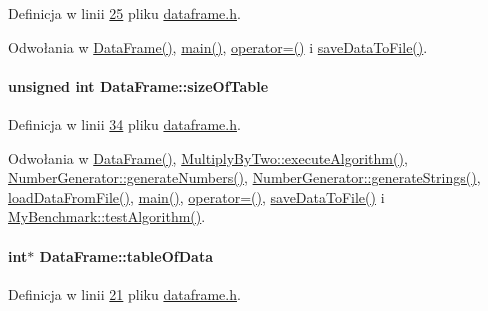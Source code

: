 Definicja w linii \hyperlink{dataframe_8h_source_l00025}{25} pliku \hyperlink{dataframe_8h_source}{dataframe.\-h}.



Odwołania w \hyperlink{dataframe_8cpp_source_l00012}{Data\-Frame()}, \hyperlink{main_8cpp_source_l00018}{main()}, \hyperlink{dataframe_8cpp_source_l00044}{operator=()} i \hyperlink{dataframe_8cpp_source_l00032}{save\-Data\-To\-File()}.

\hypertarget{class_data_frame_aa5d1905c6910cad07ab5189bd34b13ab}{
\paragraph[{size\-Of\-Table}]{\setlength{\rightskip}{0pt plus 5cm}unsigned int Data\-Frame\-::size\-Of\-Table}}\label{class_data_frame_aa5d1905c6910cad07ab5189bd34b13ab}


Definicja w linii \hyperlink{dataframe_8h_source_l00034}{34} pliku \hyperlink{dataframe_8h_source}{dataframe.\-h}.



Odwołania w \hyperlink{dataframe_8cpp_source_l00012}{Data\-Frame()}, \hyperlink{multiplybytwo_8cpp_source_l00011}{Multiply\-By\-Two\-::execute\-Algorithm()}, \hyperlink{numbergenerator_8h_source_l00035}{Number\-Generator\-::generate\-Numbers()}, \hyperlink{numbergenerator_8cpp_source_l00010}{Number\-Generator\-::generate\-Strings()}, \hyperlink{dataframe_8cpp_source_l00020}{load\-Data\-From\-File()}, \hyperlink{main_8cpp_source_l00018}{main()}, \hyperlink{dataframe_8cpp_source_l00044}{operator=()}, \hyperlink{dataframe_8cpp_source_l00032}{save\-Data\-To\-File()} i \hyperlink{mybenchmark_8cpp_source_l00012}{My\-Benchmark\-::test\-Algorithm()}.

\hypertarget{class_data_frame_a8edc4ce524483e2e5069067267ccdcbf}{
\paragraph[{table\-Of\-Data}]{\setlength{\rightskip}{0pt plus 5cm}int$\ast$ Data\-Frame\-::table\-Of\-Data}}\label{class_data_frame_a8edc4ce524483e2e5069067267ccdcbf}


Definicja w linii \hyperlink{dataframe_8h_source_l00021}{21} pliku \hyperlink{dataframe_8h_source}{dataframe.\-h}.



